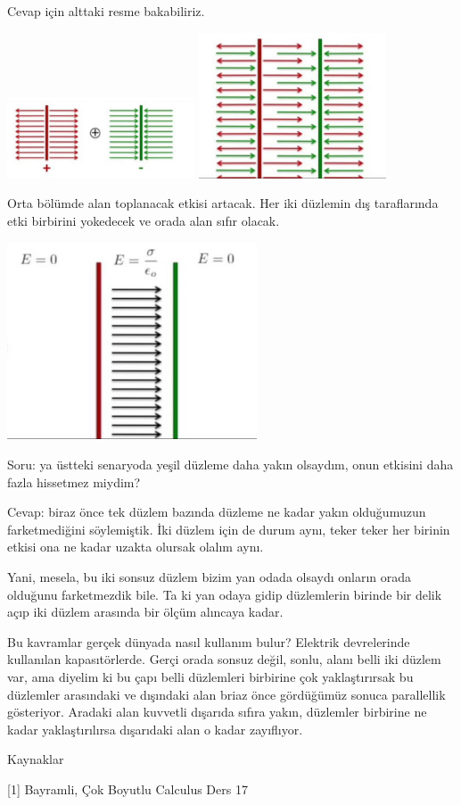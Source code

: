 \documentclass[12pt,fleqn]{article}\usepackage{../../common}
\begin{document}
Cevap için alttaki  resme bakabiliriz. 

\includegraphics[width=15em]{06_11.jpg}
\includegraphics[width=15em]{06_12.jpg}

Orta bölümde alan toplanacak etkisi artacak. Her iki düzlemin dış taraflarında
etki birbirini yokedecek ve orada alan sıfır olacak.

\includegraphics[width=20em]{06_13.jpg}

Soru: ya üstteki senaryoda yeşil düzleme daha yakın olsaydım, onun etkisini daha
fazla hissetmez miydim?

Cevap: biraz önce tek düzlem bazında düzleme ne kadar yakın olduğumuzun
farketmediğini söylemiştik. İki düzlem için de durum aynı, teker teker her
birinin etkisi ona ne kadar uzakta olursak olalım aynı.

Yani, mesela, bu iki sonsuz düzlem bizim yan odada olsaydı onların orada
olduğunu farketmezdik bile. Ta ki yan odaya gidip düzlemlerin birinde bir delik
açıp iki düzlem arasında bir ölçüm alıncaya kadar.

Bu kavramlar gerçek dünyada nasıl kullanım bulur? Elektrik devrelerinde
kullanılan kapasıtörlerde. Gerçi orada sonsuz değil, sonlu, alanı belli iki
düzlem var, ama diyelim ki bu çapı belli düzlemleri birbirine çok yaklaştırırsak
bu düzlemler arasındaki ve dışındaki alan briaz önce gördüğümüz sonuca
parallellik gösteriyor. Aradaki alan kuvvetli dışarıda sıfıra yakın, düzlemler
birbirine ne kadar yaklaştırılırsa dışarıdaki alan o kadar zayıflıyor. 

Kaynaklar

[1] Bayramli, Çok Boyutlu Calculus Ders 17
\end{document}
